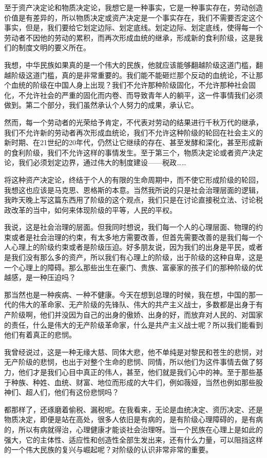 \documentclass[UTF8, 12pt, a4paper]{ctexrep}
\begin{document}
至于资产决定论和物质决定论，我想它是一种事实，它是一种事实存在，劳动创造价值是有差异的，所以物质决定或资产决定是一个事实存在，我们不需要否定这个事实，但是，我们要给它划定边际、划定底线。划定边际、划定底线，使得每一个劳动者不因他的劳动的累积，而再次形成血统的继承，形成新的食利阶级，这是我们的制度文明的要义所在。

我想，中华民族如果真的是一个伟大的民族，他就应该能够翻越阶级这道门槛，翻越阶级这道门槛，真的是非常重要的。我们能不能砸烂那个反动的血统论，不让那个血统的阶级在中国人身上出现？我们不允许那种阶级固化，不允许那种社会固化，不允许社会的严重的固化而内卷、而导致青年人的躺平，这一件事情我们必须做到。第二个部分，我们虽然承认个人努力的成果，承认它。

然而，每一个劳动者的光荣给予肯定，不代表对劳动的结果进行千秋万代的继承，我们不允许新的劳动者再次形成血统论，我们不允许这种阶级的轮回在社会主义的新时期、在21世纪的20年代，仍然让它继续的存在、甚至发酵和深化，甚至形成新的食利阶级，我们不允许这样的事情发生。至于第三个，物质决定论或者资产决定论，我们必须划定边界，通过伟大的制度建设——税政……

将这种资产决定论，终结于个人的有限的生命周期中，而不使它形成阶级的轮回，我想这也应该是马克思、恩格斯的本意。当然我所说的只是社会治理层面的逻辑，我昨天晚上写这篇东西用了阶级的这个观点，我们只是在讨论直接税立法、讨论税政改革的当中，如何来体现阶级的平等，人民的平权。

我说，这是社会治理的层面。但我同时想说，我们每一个人的心理层面、物理的约束或者是社会治理的约束，有太多地方需要改善，但首先需要改善的是我们每一个人心理上的阶级约束或者是阶级压迫。好多朋友说，因为我们的出身是平民，或者是我们没有那么多的资产，所以我们有心理上的阶级，出于阶级的这种自卑，这是一个心理上的障碍。那么那些出生在豪门、贵族、富豪家的孩子们的那种阶级的优越感，是一种压迫吗？

那当然也是一种疾病、一种不健康。今天在想到总理的时候，我在想，中国的那一代的伟大的革命家、无产阶级的先锋队、伟大的共产主义战士，多数都是出身于有产阶级啊，他们并没因为自己的出身的傲娇、出身的好，而放弃对人民的、对国家的责任，什么是伟大的无产阶级革命家，什么是共产主义战士呢？所以我们能看到他们有着真正的悲悯。

我曾经说过，这是一种无缘大慈、同体大悲，他不单纯是对黎民和苍生的悲悯，对无产阶级的悲悯，也出于对整个生命的悲悯、同情，所以他们为这件事情去做了努力，他们才是我们心目中真正的伟人，甚至，他们就是我们心中的神。至于那些基于种族、种姓、血统、财富、地位而形成的大牛们，例如薇娅，当然也例如那些股神们、超人们，他们有这份悲悯吗？

都那样了，还琢磨着偷税、漏税呢。在我看来，无论是血统决定、资历决定、还是物质决定，即便是站在高处，很多人依旧是有病的，是有阶级心理障碍的，是有病的，所以有病就得治，心理健康才能谈社会治理呀。当一个民族在心理上是如此的强大，它的主体性、适应性和创造性全部生发出来，还有什么力量，可以阻挡这样的一个伟大民族的复兴与崛起呢？对阶级的认识非常非常的重要。
\end{document}
